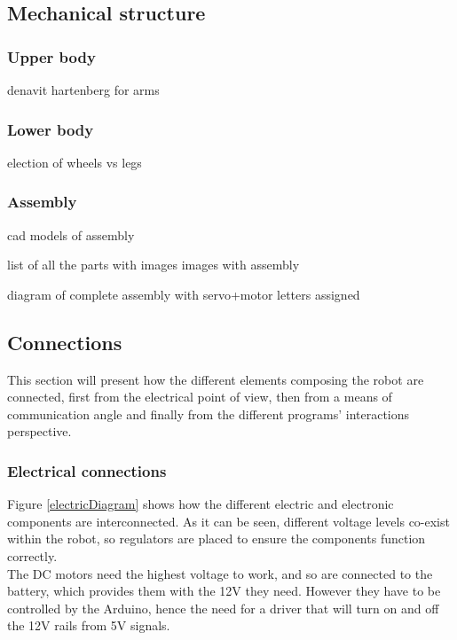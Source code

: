 \subsection{Mechanical structure}
\subsubsection{Upper body}
denavit hartenberg for arms

\subsubsection{Lower body}
election of wheels vs legs

\subsubsection{Assembly}
cad models of assembly

list of all the parts with images
images with assembly 

diagram of complete assembly with servo+motor letters assigned








\subsection{Connections}

This section will present how the different elements composing the robot are connected, first from the electrical point of view, then from a means of communication angle and finally from the different programs' interactions perspective.




\subsubsection{Electrical connections}

Figure \ref{electricDiagram} shows how the different electric and electronic components are interconnected.  As it can be seen, different voltage levels co-exist within the robot, so regulators are placed to ensure the components function correctly. \\

The DC motors need the highest voltage to work, and so are connected to the battery, which provides them with the 12V they need. However they have to be controlled by the Arduino, hence the need for a driver that will turn on and off the 12V rails from 5V signals.\\

